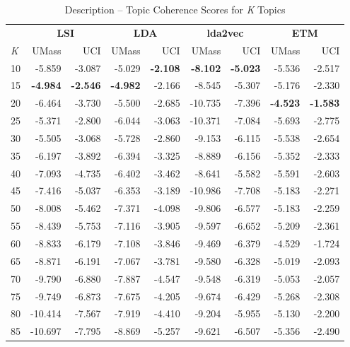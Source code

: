 \documentclass[letterpaper,12pt]{article}
\begin{document}
\begin{table}
	\caption{\label{tab:combo_description_tc} Description -- Topic Coherence Scores for \emph{K} Topics}
	\begin{center}
		\begin{tabular}{|l|rr|rr|rr|rr|}
			\hline
			{} & \multicolumn{2}{c|}{\textbf{LSI}} & \multicolumn{2}{c|}{\textbf{LDA}} & \multicolumn{2}{c|}{\textbf{lda2vec}} & \multicolumn{2}{c|}{\textbf{ETM}} \\
			\emph{K} &   UMass &    UCI &  UMass &    UCI &   UMass &    UCI &  UMass &    UCI \\
			\hline
			10  &  -5.859 & -3.087 & -5.029 & \textbf{-2.108} &  \textbf{-8.102} & \textbf{-5.023} & -5.536 & -2.517 \\
			15  &  \textbf{-4.984} & \textbf{-2.546} & \textbf{-4.982} & -2.166 &  -8.545 & -5.307 & -5.176 & -2.330 \\
			20  &  -6.464 & -3.730 & -5.500 & -2.685 & -10.735 & -7.396 & \textbf{-4.523} & \textbf{-1.583} \\
			25  &  -5.371 & -2.800 & -6.044 & -3.063 & -10.371 & -7.084 & -5.693 & -2.775 \\
			30  &  -5.505 & -3.068 & -5.728 & -2.860 &  -9.153 & -6.115 & -5.538 & -2.654 \\
			35  &  -6.197 & -3.892 & -6.394 & -3.325 &  -8.889 & -6.156 & -5.352 & -2.333 \\
			40  &  -7.093 & -4.735 & -6.402 & -3.462 &  -8.641 & -5.582 & -5.591 & -2.603 \\
			45  &  -7.416 & -5.037 & -6.353 & -3.189 & -10.986 & -7.708 & -5.183 & -2.271 \\
			50  &  -8.008 & -5.462 & -7.371 & -4.098 &  -9.806 & -6.577 & -5.183 & -2.259 \\
			55  &  -8.439 & -5.753 & -7.116 & -3.905 &  -9.597 & -6.652 & -5.209 & -2.361 \\
			60  &  -8.833 & -6.179 & -7.108 & -3.846 &  -9.469 & -6.379 & -4.529 & -1.724 \\
			65  &  -8.871 & -6.191 & -7.067 & -3.781 &  -9.580 & -6.328 & -5.019 & -2.093 \\
			70  &  -9.790 & -6.880 & -7.887 & -4.547 &  -9.548 & -6.319 & -5.053 & -2.057 \\
			75  &  -9.749 & -6.873 & -7.675 & -4.205 &  -9.674 & -6.429 & -5.268 & -2.308 \\
			80  & -10.414 & -7.567 & -7.919 & -4.410 &  -9.204 & -5.955 & -5.130 & -2.200 \\
			85  & -10.697 & -7.795 & -8.869 & -5.257 &  -9.621 & -6.507 & -5.356 & -2.490 \\

\end{tabular}
\end{center}
\end{table}
\end{document}
